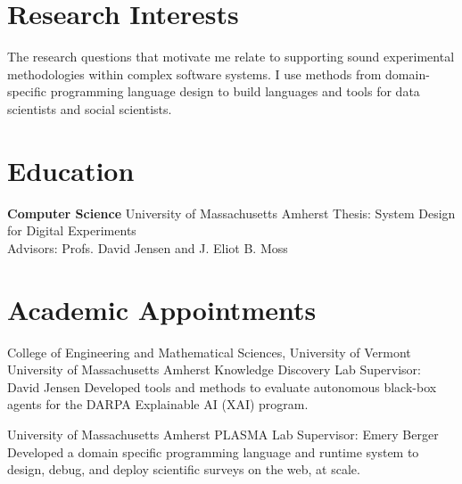\documentclass[11pt,a4paper,sans]{moderncv} %
\newcommand{\umass}{University of Massachusetts Amherst}
\newcommand{\cems}{College of Engineering and Mathematical Sciences}
\newcommand{\uvm}{University of Vermont}
\begin{document}
\makecvtitle %
\section{Research Interests}
The research questions that motivate me relate to supporting sound experimental methodologies within complex software systems. I use methods from  domain-specific programming language design to build languages and tools for data scientists and social scientists.

\section{Education}
 {\textbf{Computer Science}}
 {}
 {\umass{}}
 {Thesis: System Design for Digital Experiments\\Advisors: Profs. David Jensen and J. Eliot B. Moss}





\section{Academic Appointments}
 {\cems{}, \uvm{}}{}{}{}
 {\umass{}}
 {Knowledge Discovery Lab}
 {Supervisor: David Jensen}
 {Developed tools and methods to evaluate autonomous black-box agents for the DARPA Explainable AI (XAI) program.}
 
 {\umass{}}
 {PLASMA Lab}
 {Supervisor: Emery Berger}
 {Developed a domain specific programming language and runtime system to design, debug, and deploy scientific surveys on the web, at scale.}
 
\end{document}
